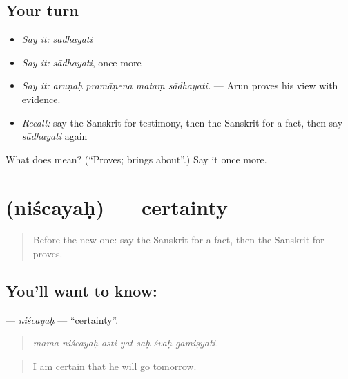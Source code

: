 \subsection*{Your turn}
\begin{itemize}
\raggedright
  \item \emph{Say it:} \emph{sādhayati}
  \item \emph{Say it:} \emph{sādhayati}, once more
  \item \emph{Say it:} \emph{aruṇaḥ pramāṇena mataṃ sādhayati.} — Arun proves his view with evidence.
  \item \emph{Recall:} say the Sanskrit for testimony, then the Sanskrit for a fact, then say \emph{sādhayati} again
\end{itemize}

\begin{tcolorbox}[breakable,colback=teal!4,colframe=teal!35!black,title={Before you move on}]
What does  mean? (\textquotedblleft{}Proves; brings about\textquotedblright{}.) Say it once more.
\end{tcolorbox}
\section[\texorpdfstring{\sk{निश्चयः} (niścayaḥ)}{निश्चयः (niścayaḥ)}]{ (niścayaḥ) — certainty}

\label{lesson:SA-C345-niscayah}



\begin{quote}
Before the new one: say the Sanskrit for a fact, then the Sanskrit for proves.
\end{quote}

\subsection*{You'll want to know: }
\textbf{} — \emph{niścayaḥ} — \textquotedblleft{}certainty\textquotedblright{}.

\begin{quote}
      
\end{quote}

\begin{quote}
\emph{mama niścayaḥ asti yat saḥ śvaḥ gamiṣyati.}
\end{quote}

\begin{quote}
I am certain that he will go tomorrow.
\end{quote}

